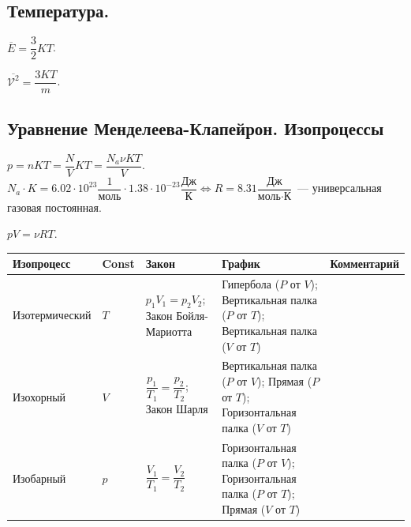\documentclass[12pt]{article}
\begin{document}
	\subsection{Температура.}
	\begin{statement}
		$\overline{E} = \dfrac{3}{2}KT$.
	\end{statement}
	\begin{statement}
		$\overline{\mathcal{V}^2} = \dfrac{3KT}{m}$.
	\end{statement}
	\subsection{Уравнение Менделеева-Клапейрон. Изопроцессы}
	$p = nKT = \dfrac{N}{V}KT = \dfrac{N_a \nu KT}{V}$. $N_a \cdot K = 6.02 \cdot 10^{23} \dfrac{1}{\text{моль}} \cdot 1.38 \cdot 10^{-23} \dfrac{\text{Дж}}{\text{К}} \Leftrightarrow R = 8.31 \dfrac{\text{Дж}}{\text{моль} \cdot \text{К}}$~--- универсальная газовая постоянная. \\
	\begin{definition}
		$pV = \nu RT$.
	\end{definition}
	\begin{xltabular}{\textwidth}{|X|X|X|X|X|}
		\hline
		Изопроцесс & Const & Закон & График & Комментарий \\
		\hline
		Изотермический & $T$ & $p_1V_1 = p_2V_2$; Закон Бойля-Мариотта & Гипербола ($P$ от $V$); Вертикальная палка ($P$ от $T$); Вертикальная палка ($V$ от $T$) & \\
		\hline
		Изохорный & $V$ & $\dfrac{p_1}{T_1} = \dfrac{p_2}{T_2}$; Закон Шарля & Вертикальная палка ($P$ от $V$); Прямая ($P$ от $T$); Горизонтальная палка ($V$ от $T$) & \\
		\hline
		Изобарный & $p$ & $\dfrac{V_1}{T_1} = \dfrac{V_2}{T_2}$ & Горизонтальная палка ($P$ от $V$); Горизонтальная палка ($P$ от $T$); Прямая ($V$ от $T$) & \\
		\hline
	\end{xltabular}
\end{document}
